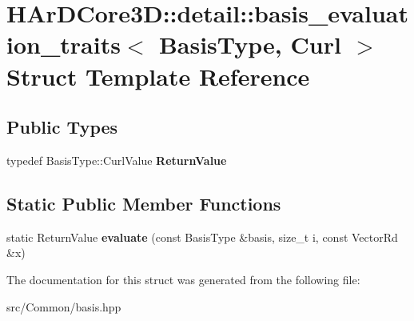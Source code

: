 \hypertarget{structHArDCore3D_1_1detail_1_1basis__evaluation__traits_3_01BasisType_00_01Curl_01_4}{}\section{H\+Ar\+D\+Core3D\+:\+:detail\+:\+:basis\+\_\+evaluation\+\_\+traits$<$ Basis\+Type, Curl $>$ Struct Template Reference}
\label{structHArDCore3D_1_1detail_1_1basis__evaluation__traits_3_01BasisType_00_01Curl_01_4}
\subsection*{Public Types}
\begin{DoxyCompactItemize}
\item 
\mbox{\label{structHArDCore3D_1_1detail_1_1basis__evaluation__traits_3_01BasisType_00_01Curl_01_4_a9282a3c44763e9d940a6d3161242d1c0}} 
typedef Basis\+Type\+::\+Curl\+Value {\bfseries Return\+Value}
\end{DoxyCompactItemize}
\subsection*{Static Public Member Functions}
\begin{DoxyCompactItemize}
\item 
\mbox{\label{structHArDCore3D_1_1detail_1_1basis__evaluation__traits_3_01BasisType_00_01Curl_01_4_a805e1ac103be2f95768dd8131e080512}} 
static Return\+Value {\bfseries evaluate} (const Basis\+Type \&basis, size\+\_\+t i, const Vector\+Rd \&x)
\end{DoxyCompactItemize}


The documentation for this struct was generated from the following file\+:\begin{DoxyCompactItemize}
\item 
src/\+Common/basis.\+hpp\end{DoxyCompactItemize}
